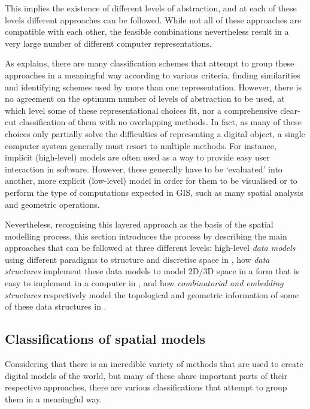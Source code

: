 This implies the existence of different levels of abstraction, and at each of these levels different approaches can be followed.
While not all of these approaches are compatible with each other, the feasible combinations nevertheless result in a very large number of different computer representations.

As  explains, there are many classification schemes that attempt to group these approaches in a meaningful way according to various criteria, finding similarities and identifying schemes used by more than one representation.
However, there is no agreement on the optimum number of levels of abstraction to be used, at which level some of these representational choices fit, nor a comprehensive clear-cut classification of them with no overlapping methods.
In fact, as many of these choices only partially solve the difficulties of representing a digital object, a single computer system generally must resort to multiple methods.
For instance, implicit (high-level) models are often used as a way to provide easy user interaction in software.
However, these generally have to be `evaluated' into another, more explicit (low-level) model in order for them to be visualised \citep{Mantyla88} or to perform the type of computations expected in GIS, such as many spatial analysis and geometric operations.

Nevertheless, recognising this layered approach as the basis of the spatial modelling process, this section introduces the process by describing the main approaches that can be followed at three different levels: high-level \emph{data models} using different paradigms to structure and discretise space in , how \emph{data structures} implement these data models to model 2D/3D space in a form that is easy to implement in a computer in , and how \emph{combinatorial and embedding structures} respectively model the topological and geometric information of some of these data structures in .

\subsection{Classifications of spatial models}
\label{ss:taxonomies}

Considering that there is an incredible variety of methods that are used to create digital models of the world, but many of these share important parts of their respective approaches, there are various classifications that attempt to group them in a meaningful way.


